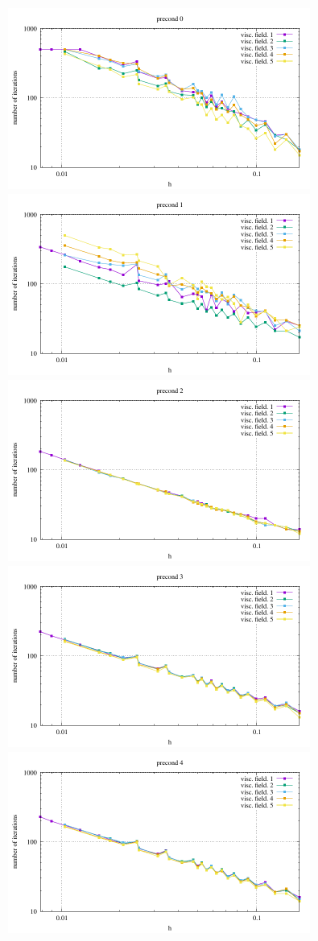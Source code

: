 \begin{center} 
\includegraphics[width=8cm]{python_codes/fieldstone_16/results/niterations_ps0.pdf}
\includegraphics[width=8cm]{python_codes/fieldstone_16/results/niterations_ps1.pdf}\\
\includegraphics[width=8cm]{python_codes/fieldstone_16/results/niterations_ps2.pdf}
\includegraphics[width=8cm]{python_codes/fieldstone_16/results/niterations_ps3.pdf}\\
\includegraphics[width=8cm]{python_codes/fieldstone_16/results/niterations_ps4.pdf}
\end{center}


